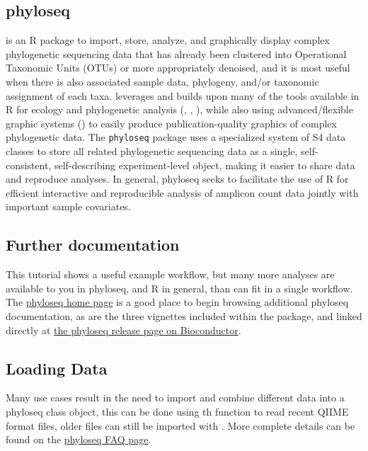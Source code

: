 
\subsection*{phyloseq}

\cite{phyloseqplosone}
is an R package to import, store, analyze, and graphically display complex
phylogenetic sequencing data that has already been
clustered into Operational Taxonomic Units (OTUs)
or more appropriately denoised,
and it is most useful when there is also associated
sample data,
phylogeny,
and/or taxonomic assignment of each taxa.
 leverages and builds upon
many of the tools available in R
for ecology and phylogenetic analysis (, , ),
while also using advanced/flexible graphic systems ()
to easily produce publication-quality graphics of complex phylogenetic data.
The {\tt phyloseq} package uses a specialized system of S4 data classes
to store all related phylogenetic sequencing data
as a single, self-consistent, self-describing experiment-level object,
making it easier to share data and reproduce analyses.
In general, phyloseq seeks to facilitate the use of R
for efficient interactive and reproducible analysis
of amplicon count data jointly with important sample covariates.

\subsection*{Further documentation}

This tutorial shows a useful example workflow,
but many more analyses are available to you in phyloseq, and R in general,
than can fit in a single workflow.
The \href{http://joey711.github.io/phyloseq/}{phyloseq home page}
is a good place to begin browsing additional phyloseq documentation,
as are the three vignettes included within the package,
and linked directly at
\href{http://bioconductor.org/packages/release/bioc/html/phyloseq.html}{the phyloseq release page on Bioconductor}.








\subsection*{Loading Data}
Many use cases result in the need to import and combine different
data into a phyloseq class object,
this can be done using th 
function to read recent QIIME format files, older files
can still be imported with .
More complete details can be found on the
\href{https://www.bioconductor.org/packages/release/bioc/vignettes/phyloseq/inst/doc/phyloseq-FAQ.html}{phyloseq FAQ page}.

